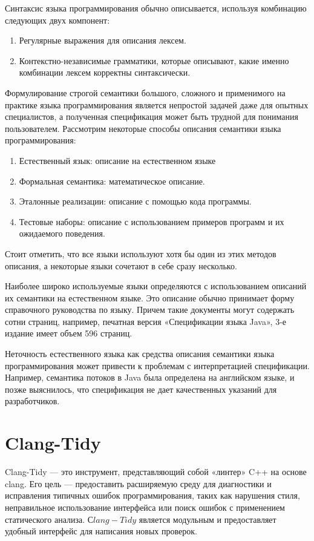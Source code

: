 \documentclass{mipt-thesis-bs}
\begin{document}
Синтаксис языка программирования обычно описывается, используя комбинацию следующих двух компонент:
\begin{enumerate}
    \item Регулярные выражения для описания лексем.
    \item Контекстно-независимые грамматики, которые описывают, какие именно комбинации лексем
    корректны синтаксически.
\end{enumerate}

Формулирование строгой семантики большого, сложного и применимого на практике языка 
программирования является непростой задачей даже для опытных специалистов, 
а полученная спецификация может быть трудной для понимания пользователем.
Рассмотрим некоторые способы описания семантики языка 
программирования:
\begin{enumerate}
    \item Естественный язык: описание на естественном языке
    \item Формальная семантика: математическое описание.
    \item Эталонные реализации: описание с помощью кода программы.
    \item Тестовые наборы: описание с использованием примеров программ
    и их ожидаемого поведения.
\end{enumerate}

Стоит отметить, что все языки используют хотя бы один из этих методов 
описания, а некоторые языки сочетают в себе сразу несколько.

Наиболее широко используемые языки определяются с использованием описаний 
их семантики на естественном языке. Это описание обычно принимает форму 
справочного руководства по языку. Причем такие документы могут содержать сотни 
страниц, например, печатная версия «Спецификации языка Java», 3-е издание имеет объем 596 страниц.

Неточность естественного языка как средства описания семантики 
языка программирования может привести к проблемам с интерпретацией 
спецификации. Например, семантика потоков в Java была определена на 
английском языке, и позже выяснилось, что спецификация не дает 
качественных указаний для разработчиков.

\section{Clang-Tidy}

Clang-Tidy — это инструмент, представляющий собой «линтер» C++ на основе clang.
Его цель — предоставить расширяемую среду для диагностики и 
исправления типичных ошибок 
программирования, таких как нарушения стиля, неправильное использование 
интерфейса или поиск ошибок с применением статического 
анализа. $Сlang-Tidy$ является модульным и предоставляет удобный 
интерфейс для написания новых проверок.
\end{document}
